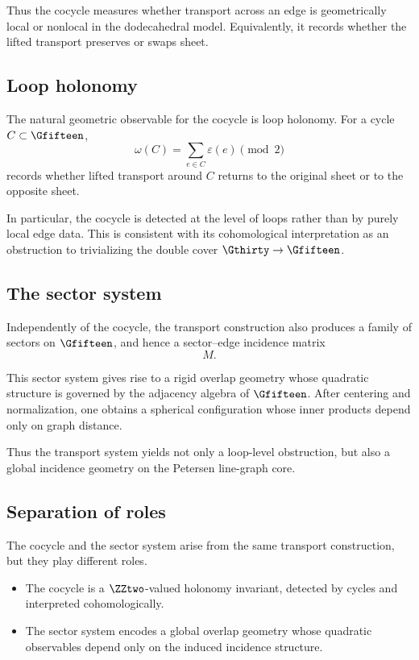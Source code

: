 Thus the cocycle measures whether transport across an edge is
geometrically local or nonlocal in the dodecahedral model. Equivalently,
it records whether the lifted transport preserves or swaps sheet.

\subsection{Loop holonomy}

The natural geometric observable for the cocycle is loop holonomy. For a
cycle $C\subset \Gfifteen$,
\[
\omega(C)=\sum_{e\in C}\varepsilon(e)\pmod 2
\]
records whether lifted transport around $C$ returns to the original
sheet or to the opposite sheet.

In particular, the cocycle is detected at the level of loops rather than
by purely local edge data. This is consistent with its cohomological
interpretation as an obstruction to trivializing the double cover
$\Gthirty\to\Gfifteen$.

\subsection{The sector system}

Independently of the cocycle, the transport construction also produces a
family of sectors on $\Gfifteen$, and hence a sector--edge incidence
matrix
\[
M.
\]

This sector system gives rise to a rigid overlap geometry whose
quadratic structure is governed by the adjacency algebra of
$\Gfifteen$. After centering and normalization, one obtains a spherical
configuration whose inner products depend only on graph distance.

Thus the transport system yields not only a loop-level obstruction, but
also a global incidence geometry on the Petersen line-graph core.

\subsection{Separation of roles}

The cocycle and the sector system arise from the same transport
construction, but they play different roles.

\begin{itemize}
\item The cocycle is a $\ZZtwo$-valued holonomy invariant, detected by
cycles and interpreted cohomologically.

\item The sector system encodes a global overlap geometry whose
quadratic observables depend only on the induced incidence structure.
\end{itemize}

